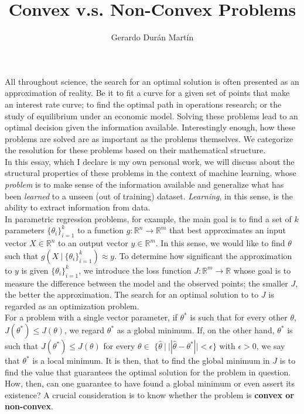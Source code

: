 \documentclass{article}
\title{Convex v.s. Non-Convex Problems}
\author{Gerardo Durán Martín}
\newcommand{\rnums}{\mathbb{R}}
\begin{document}
	\maketitle
	
	All throughout science, the search for an optimal solution is often presented as an approximation of reality. Be it to fit a curve for a given set of points that make an interest rate curve; to find the optimal path in operations research; or the study of equilibrium under an economic model. Solving these problems lead to an optimal decision given the information available. Interestingly enough, how these problems are solved are as important as the problems themselves. We categorize the resolution for these problems based on their mathematical structure.\\
	
	In this essay, which I declare is my own personal work, we will discuss about the structural properties of these problems in the context of machine learning, whose \textit{problem} is to make sense of the information available and generalize what has been \textit{learned} to a unseen (out of training) dataset. \textit{Learning}, in this sense, is the ability to extract information from data.\\
	
	In parametric regression problems, for example, the main goal is to find a set of $k$ parameters $\{\theta_i\}_{i=1}^k$ to a function $g:\rnums^n\to\rnums^m$ that best approximates an input vector $X\in\rnums^n$ to an output vector $y\in\rnums^m$. In this sense, we would like to find $\theta$ such that $g(X\ | \ \{\theta_i\}_{i=1}^k) \approx y$. To determine how significant the approximation to $y$ is given  $\{\theta_i\}_{i=1}^k$, we introduce the loss function $J: \rnums^m \to \rnums$ whose goal is to measure the difference between the model and the observed points; the smaller $J$, the better the approximation. The search for an optimal solution to to $J$ is regarded as an optimization problem.\\
	
	For a problem with a single vector parameter, if $\theta^*$ is such that for every other $\theta$, $J(\theta^*) \leq J(\theta)$, we regard $\theta^*$ as a global minimum. If, on the other hand, $\theta^*$ is such that $J(\theta^*) \leq J(\theta)$ for every $\theta \in$ $\{\hat\theta \ | \  ||\hat\theta - \theta^*|| < \epsilon\}$ with $\epsilon > 0$, we say that $\theta^*$ is a local minimum. It is then, that to find the global minimum in $J$ is to find the value that guarantees the optimal solution for the problem in question. How, then, can one guarantee to have found a global minimum or even assert its existence? A crucial consideration is to know whether the problem is \textbf{convex or non-convex}.\\
		
\end{document}

